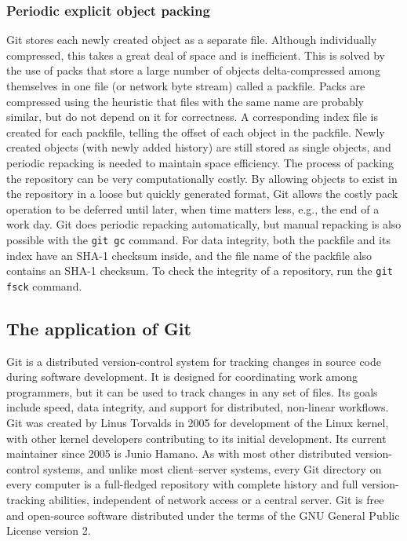 \documentclass[a4paper]{report}
\begin{document}
\subsubsection{Periodic explicit object packing}
Git stores each newly created object as a separate file. Although individually compressed, this takes a great deal of space and is inefficient. This is solved by the use of packs that store a large number of objects delta-compressed among themselves in one file (or network byte stream) called a packfile. Packs are compressed using the heuristic that files with the same name are probably similar, but do not depend on it for correctness. A corresponding index file is created for each packfile, telling the offset of each object in the packfile. Newly created objects (with newly added history) are still stored as single objects, and periodic repacking is needed to maintain space efficiency. The process of packing the repository can be very computationally costly. By allowing objects to exist in the repository in a loose but quickly generated format, Git allows the costly pack operation to be deferred until later, when time matters less, e.g., the end of a work day. Git does periodic repacking automatically, but manual repacking is also possible with the \lstinline !git gc! command. For data integrity, both the packfile and its index have an SHA-1 checksum inside, and the file name of the packfile also contains an SHA-1 checksum. To check the integrity of a repository, run the \lstinline!git fsck! command.
\subsection{The application of Git}

Git is a distributed version-control system for tracking changes in source code during software development. It is designed for coordinating work among programmers, but it can be used to track changes in any set of files. Its goals include speed, data integrity, and support for distributed, non-linear workflows.
Git was created by Linus Torvalds in 2005 for development of the Linux kernel, with other kernel developers contributing to its initial development. Its current maintainer since 2005 is Junio Hamano.
As with most other distributed version-control systems, and unlike most client–server systems, every Git directory on every computer is a full-fledged repository with complete history and full version-tracking abilities, independent of network access or a central server.
Git is free and open-source software distributed under the terms of the GNU General Public License version 2.
\end{document}
